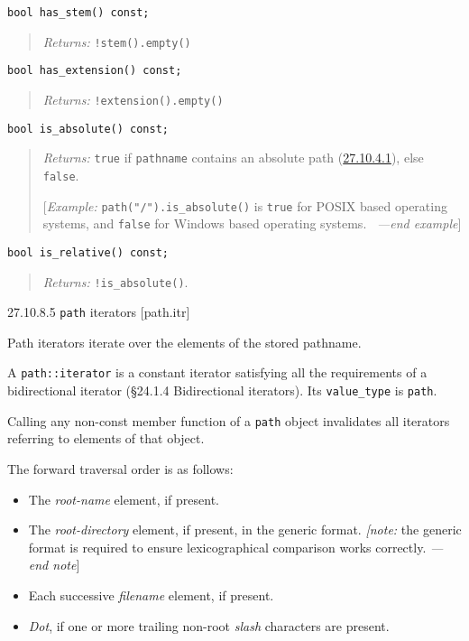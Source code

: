 \begin{verbatim}
bool has_stem() const;
\end{verbatim}

\begin{quote}
\emph{Returns:} \texttt{!stem().empty()}
\end{quote}

\begin{verbatim}
bool has_extension() const;
\end{verbatim}

\begin{quote}
\emph{Returns:} \texttt{!extension().empty()}
\end{quote}

\begin{verbatim}
bool is_absolute() const;
\end{verbatim}

\begin{quote}
\emph{Returns:} \texttt{true} if \texttt{pathname} contains an absolute
path (\hyperref[fs.def.absolute-path]{27.10.4.1}), else \texttt{false}.

{[}\emph{Example:} \texttt{path("/").is\_absolute()} is \texttt{true}
for POSIX based operating systems, and \texttt{false} for Windows based
operating systems.~ \emph{---end example}{]}
\end{quote}

\begin{verbatim}
bool is_relative() const;
\end{verbatim}

\begin{quote}
\emph{Returns:} \texttt{!is\_absolute()}.
\end{quote}

27.10.8.5 \texttt{path} iterators {[}path.itr{]}

Path iterators iterate over the elements of the stored pathname.

A \texttt{path::iterator} is a constant iterator satisfying all the
requirements of a bidirectional iterator (§24.1.4 Bidirectional
iterators). Its \texttt{value\_type} is \texttt{path}.

Calling any non-const member function of a \texttt{path} object
invalidates all iterators referring to elements of that object.

The forward traversal order is as follows:

\begin{itemize}
\tightlist
\item
  The \emph{root-name} element, if present.
\item
  The \emph{root-directory} element, if present, in the generic format.
  \emph{{[}note:} the generic format is required to ensure
  lexicographical comparison works correctly. \emph{---end note}{]}
\item
  Each successive \emph{filename} element, if present.
\item
  \emph{Dot}, if one or more trailing non-root \emph{slash} characters
  are present.
\end{itemize}

